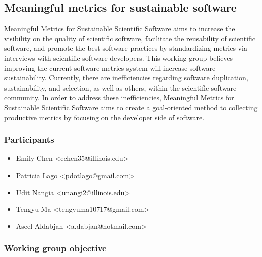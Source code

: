 \subsection{Meaningful metrics for sustainable software}
\label{sec:metrics}



Meaningful Metrics for Sustainable Scientific Software aims to increase the visibility on the quality of scientific software, facilitate the reusability of scientific software, and promote the best software practices by standardizing metrics via interviews with scientific software developers. This working group believes improving the current software metrics system will increase software sustainability. Currently, there are inefficiencies regarding software duplication, sustainability, and selection, as well as others, within the scientific software community. In order to address these inefficiencies, Meaningful Metrics for Sustainable Scientific Software aims to create a goal-oriented method to collecting productive metrics by focusing on the developer side of software.

\subsubsection{Participants}


\begin{itemize}
\item Emily Chen <echen35@illinois.edu>
\item Patricia Lago <pdotlago@gmail.com>
\item Udit Nangia <unangi2@illinois.edu>
\item Tengyu Ma <tengyuma10717@gmail.com>
\item Aseel Aldabjan <a.dabjan@hotmail.com>
\end{itemize}

\subsubsection{Working group objective}


